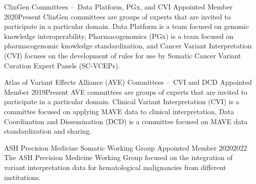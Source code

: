 \documentclass[10pt]{article} %
\begin{document}
 \cmte
{ClinGen Committees – Data Platform, PGx, and CVI}
{Appointed Member}
{2020}{Present}
{ClinGen committees are groups of experts that are invited to participate in a particular domain.
Data Platform is a team focused on genomic knowledge interoperability, Pharmacogenomics (PGx) is
a team focused on pharmacogenomic knowledge standardization, and Cancer Variant Interpretation (CVI)
focuses on the development of rules for use by Somatic Cancer Variant Curation Expert Panels
(SC-VCEPs).}

 \cmte
{Atlas of Variant Effects Alliance (AVE) Committees – CVI and DCD}
{Appointed Member}
{2019}{Present}
{AVE committees are groups of experts that are invited to participate in a particular domain.
Clinical Variant Interpretation (CVI) is a committee focused on applying MAVE data to clinical interpretation,
Data Coordination and Dissemination (DCD) is a committee focused on MAVE data standardization and sharing.}

 \cmte
{ASH Precision Medicine Somatic Working Group}
{Appointed Member}
{2020}{2022}
{The ASH Precision Medicine Working Group focused on the integration of variant interpretation data for
hematological malignancies from different institutions.}



\end{document}
